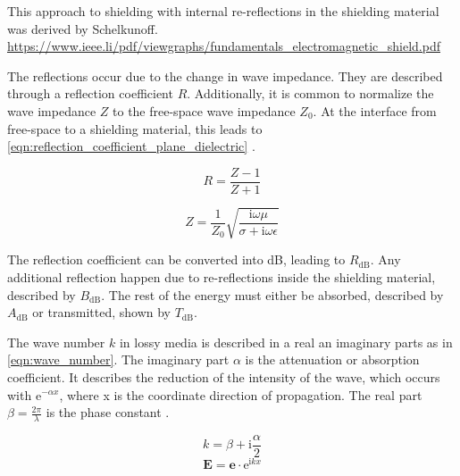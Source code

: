 This approach to shielding with internal re-reflections in the shielding material was derived by Schelkunoff. 
\url{https://www.ieee.li/pdf/viewgraphs/fundamentals_electromagnetic_shield.pdf}

The reflections occur due to the change in wave impedance. They are described through a reflection coefficient $R$. Additionally, it is common to normalize the wave impedance $Z$ to the free-space wave impedance $Z_0$. At the interface from free-space to a shielding material, this leads to \autoref{eqn:reflection_coefficient_plane_dielectric} \cite{Collin_2015}. 

\begin{equation}
    R=\frac{Z-1}{Z+1}
    \label{eqn:reflection_coefficient_plane_dielectric}
\end{equation}

\begin{equation}
    Z=\frac{1}{Z_0}\sqrt{\frac{\mathrm{i}\omega\mu}{\sigma+\mathrm{i}\omega\epsilon}}
    \label{eqn:rel_wave_imp}
\end{equation}

The reflection coefficient can be converted into dB, leading to $R_\mathrm{dB}$. Any additional reflection happen due to re-reflections inside the shielding material, described by $B_\mathrm{dB}$. The rest of the energy must either be absorbed, described by $A_\mathrm{dB}$ or transmitted, shown by $T_\mathrm{dB}$. 


The wave number $k$ in lossy media is described in a real an imaginary parts as in \autoref{eqn:wave_number}. The imaginary part $\alpha$ is the attenuation or absorption coefficient. It describes the reduction of the intensity of the wave, which occurs with $\mathrm{e}^{-\alpha x}$, where x is the coordinate direction of propagation. The real part $\beta=\frac{2\pi}{\lambda}$ is the phase constant \cite{Jackson}.


\begin{equation}
    k = \beta + \mathrm{i}\frac{\alpha}{2}
    \label{eqn:wave_number}
\end{equation}
\begin{equation}
    \mathbf{E} = \mathbf{e}\cdot \mathrm{e}^{\mathrm{i}kx}
\end{equation}


